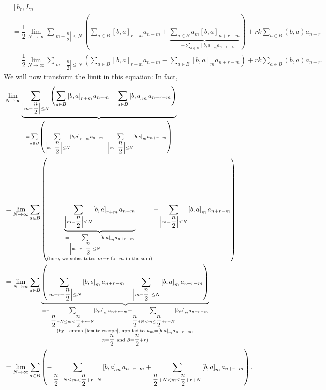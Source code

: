 \documentclass[etingof-lie.tex]{subfiles}
\begin{document}
\begin{align}
&  \left[  b_{r},L_{n}\right] \nonumber\\
&  =\dfrac{1}{2}\lim\limits_{N\rightarrow\infty}\sum\limits_{\left\vert
m-\dfrac{n}{2}\right\vert \leq N}\left(  \sum\limits_{a\in B}\left[
b,a\right]  _{r+m}a_{n-m}+\underbrace{\sum\limits_{a\in B}a_{m}\left[
b,a\right]  _{n+r-m}}_{=-\sum\limits_{a\in B}\left[  b,a\right]  _{m}%
a_{n+r-m}}\right)  +rk\sum\limits_{a\in B}\left(  b,a\right)  a_{n+r}%
\nonumber\\
&  =\dfrac{1}{2}\lim\limits_{N\rightarrow\infty}\sum\limits_{\left\vert
m-\dfrac{n}{2}\right\vert \leq N}\left(  \sum\limits_{a\in B}\left[
b,a\right]  _{r+m}a_{n-m}-\sum\limits_{a\in B}\left[  b,a\right]
_{m}a_{n+r-m}\right)  +rk\sum\limits_{a\in B}\left(  b,a\right)  a_{n+r}.
\label{pf.sugawara.b.9}%
\end{align}
We will now transform the limit in this equation: In fact,%
\begin{align*}
&  \lim\limits_{N\rightarrow\infty}\underbrace{\sum\limits_{\left\vert
m-\dfrac{n}{2}\right\vert \leq N}\left(  \sum\limits_{a\in B}\left[
b,a\right]  _{r+m}a_{n-m}-\sum\limits_{a\in B}\left[  b,a\right]
_{m}a_{n+r-m}\right)  }_{=\sum\limits_{a\in B}\left(  \sum\limits_{\left\vert
m-\dfrac{n}{2}\right\vert \leq N}\left[  b,a\right]  _{r+m}a_{n-m}%
-\sum\limits_{\left\vert m-\dfrac{n}{2}\right\vert \leq N}\left[  b,a\right]
_{m}a_{n+r-m}\right)  }\\
&  =\lim\limits_{N\rightarrow\infty}\sum\limits_{a\in B}\left(
\underbrace{\sum\limits_{\left\vert m-\dfrac{n}{2}\right\vert \leq N}\left[
b,a\right]  _{r+m}a_{n-m}}_{\substack{=\sum\limits_{\left\vert m-r-\dfrac
{n}{2}\right\vert \leq N}\left[  b,a\right]  _{m}a_{n+r-m}\\\text{(here, we
substituted }m-r\text{ for }m\text{ in the sum)}}}-\sum\limits_{\left\vert
m-\dfrac{n}{2}\right\vert \leq N}\left[  b,a\right]  _{m}a_{n+r-m}\right) \\
&  =\lim\limits_{N\rightarrow\infty}\sum\limits_{a\in B}\underbrace{\left(
\sum\limits_{\left\vert m-r-\dfrac{n}{2}\right\vert \leq N}\left[  b,a\right]
_{m}a_{n+r-m}-\sum\limits_{\left\vert m-\dfrac{n}{2}\right\vert \leq N}\left[
b,a\right]  _{m}a_{n+r-m}\right)  }_{\substack{=-\sum\limits_{\dfrac{n}%
{2}-N\leq m<\dfrac{n}{2}+r-N}\left[  b,a\right]  _{m}a_{n+r-m}+\sum
\limits_{\dfrac{n}{2}+N<m\leq\dfrac{n}{2}+r+N}\left[  b,a\right]
_{m}a_{n+r-m}\\\text{(by Lemma \ref{lem.telescope}, applied to }u_{m}=\left[
b,a\right]  _{m}a_{n+r-m}\text{,}\\\alpha=\dfrac{n}{2}\text{ and }\beta
=\dfrac{n}{2}+r\text{)}}}\\
&  =\lim\limits_{N\rightarrow\infty}\sum\limits_{a\in B}\left(  -\sum
\limits_{\dfrac{n}{2}-N\leq m<\dfrac{n}{2}+r-N}\left[  b,a\right]
_{m}a_{n+r-m}+\sum\limits_{\dfrac{n}{2}+N<m\leq\dfrac{n}{2}+r+N}\left[
b,a\right]  _{m}a_{n+r-m}\right)  .
\end{align*}
\end{document}
